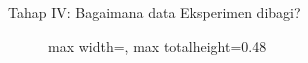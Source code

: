 \documentclass{beamer}
\def\\{}%
\begin{document}
\begin{frame}{Tahap IV: Bagaimana data Eksperimen dibagi?}
\begin{figure}[H]
\begin{adjustbox}{max width=\textwidth, max totalheight=0.48\textheight}
\begin{tikzpicture}
    \end{tikzpicture}
    \end{adjustbox}
  \end{figure}
\end{frame}
\end{document}
